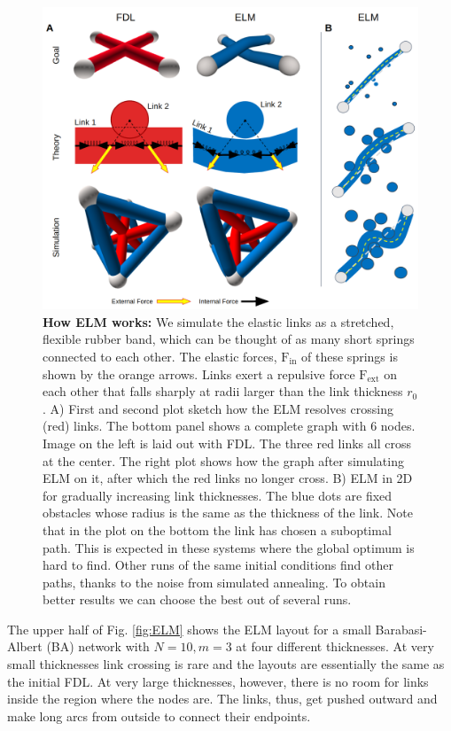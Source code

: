 \documentclass[nofootinbib,preprint,floatfix]{revtex4} %
\begin{document}
\begin{figure}
    \centering
    \includegraphics[width = .8\columnwidth]{fig-09-19/elf-resolve-2d.png}%
    \caption{{\bf How ELM works:} We simulate the elastic links as a stretched, flexible rubber band, which can be thought of as many short springs connected to each other. The elastic forces, $\mathrm{F}_{\mathrm{in}}$ of these springs is shown by the orange arrows. Links exert a repulsive force $\mathrm{F}_{\mathrm{ext}}$  on each other that falls sharply at radii larger than the link thickness $r_0$. 
    A) First and second plot sketch how the ELM resolves crossing (red) links. The bottom panel shows a complete graph with 6 nodes. Image on the left is laid out with FDL. The three red links all cross at the center. The right plot shows how the graph after simulating ELM on it, after which the red links no longer cross. B) ELM in 2D for gradually increasing link thicknesses. The blue dots are fixed obstacles whose radius is the same as the thickness of the link. Note that in the plot on the bottom the link has chosen a suboptimal path. This is  expected in these systems where the global optimum is hard to find. Other runs of the same initial conditions find other paths, thanks to the noise from simulated annealing. To obtain better results we can choose the best out of several runs.}
    \label{fig:resolve}
\end{figure}
%
The upper half of Fig. \ref{fig:ELM} shows the ELM layout for a small Barabasi-Albert (BA) network with $N=10, m=3$ at four different thicknesses. At very small thicknesses link crossing is rare and the layouts are essentially the same as the initial FDL. At very large thicknesses, however, there is no room for links inside the region where the nodes are. The links, thus, get pushed outward and make long arcs from outside to connect their endpoints.
\end{document}
